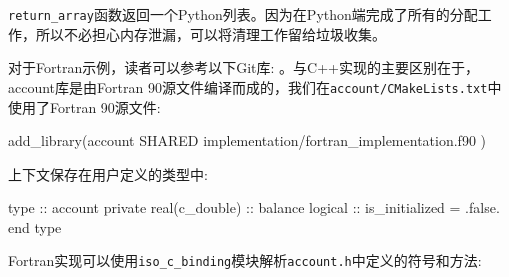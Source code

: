 \texttt{return\_array}函数返回一个Python列表。因为在Python端完成了所有的分配工作，所以不必担心内存泄漏，可以将清理工作留给垃圾收集。

对于Fortran示例，读者可以参考以下Git库: 。与C++实现的主要区别在于，account库是由Fortran 90源文件编译而成的，我们在\texttt{account/CMakeLists.txt}中使用了Fortran 90源文件:

\begin{codebox}[cmake]
add_library(account
  SHARED
    implementation/fortran_implementation.f90
  )
\end{codebox}

上下文保存在用户定义的类型中:

\begin{codebox}[fortran]
type :: account
  private
  real(c_double) :: balance
  logical :: is_initialized = .false.
end type
\end{codebox}

Fortran实现可以使用\texttt{iso\_c\_binding}模块解析\texttt{account.h}中定义的符号和方法:

